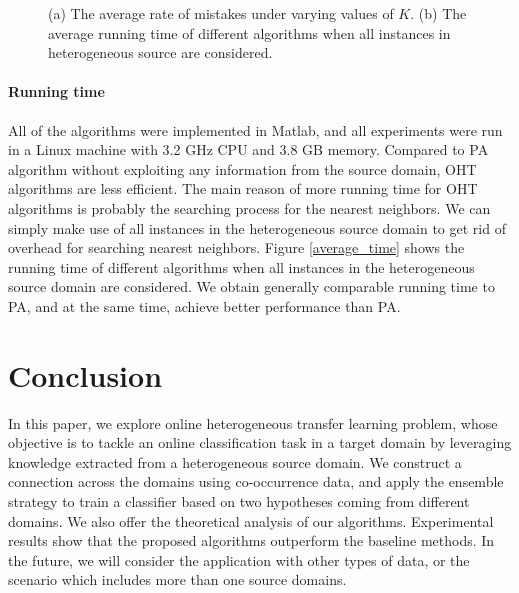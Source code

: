 \documentclass[letterpaper]{article}
\theoremstyle{remark}
\theoremstyle{definition}
\begin{document}
\begin{figure}[!htb]
\centering
  \caption{(a) The average rate of mistakes under varying values of $K$. (b) The average running time of different algorithms when all instances in heterogeneous source are considered.}
  \label{average eok}
\end{figure}

\paragraph{Running time}
All of the algorithms were implemented in Matlab, and all experiments were run in a Linux machine with 3.2 GHz CPU and 3.8 GB memory.
Compared to PA algorithm without exploiting any information from the source domain, OHT algorithms are less efficient.
The main reason of more running time for OHT algorithms is probably the searching process for the nearest neighbors.
We can simply make use of all instances in the heterogeneous source domain to get rid of overhead for searching nearest neighbors.
Figure \ref{average_time} shows the running time of different algorithms when all instances in the heterogeneous source domain are considered.
We obtain generally comparable running time to PA, and at the same time, achieve better performance than PA.

\section{Conclusion}

In this paper, we explore online heterogeneous transfer learning problem, whose objective is to tackle an online classification task in a target domain by leveraging knowledge extracted from a heterogeneous source domain.
We construct a connection across the domains using co-occurrence data, and apply the ensemble strategy to train a classifier based on two hypotheses coming from different domains.
We also offer the theoretical analysis of our algorithms.
Experimental results show that the proposed algorithms outperform the baseline methods.
In the future, we will consider the application with other types of data, or the scenario which includes more than one source domains.



\end{document}

